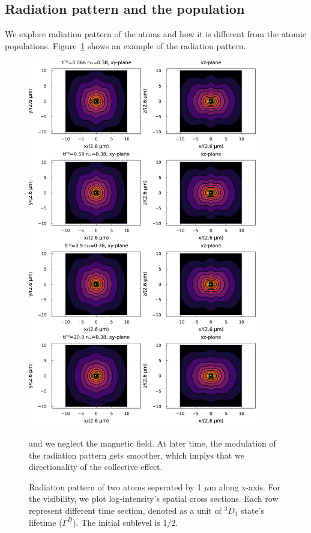 \documentclass{article}
\begin{document}
\subsection{Radiation pattern and the population}
We explore radiation pattern of the atoms and how it is different from the atomic populations. Figure~\ref{fig:radiation_pattern} shows an example of the radiation pattern. 
\begin{figure}
    \includegraphics[width=0.9\textwidth]{[4]|F_i=2.5,1.5,1.5,0.5|displacement=0.385,0.0,0.0|exc_frac=0.018,0.032|m_exc=0.5.jld2_radiation_pattern_logInt.pdf}
    \caption{Radiation pattern of two atoms seperated by 1 $\mu$m along x-axis. For the visibility, we plot log-intensity's spatial cross sections. Each row represent different time section, denoted as a unit of $^3D_1$ state's lifetime ($\Gamma^D$). The initial sublevel is $1/2$. \label{fig:radiation_pattern}} and we neglect the magnetic field.  At later time, the modulation of the radiation pattern gets smoother, which implys that we directionality of the collective effect.
\end{figure} 
\end{document}
